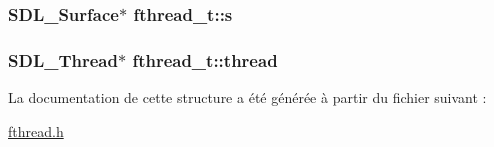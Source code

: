 \hypertarget{structfthread__t_a6d86e21267930a240426853ab443245b}{
\subsubsection[{s}]{\setlength{\rightskip}{0pt plus 5cm}\-S\-D\-L\-\_\-\-Surface$\ast$ {\bf fthread\-\_\-t\-::s}}}\label{structfthread__t_a6d86e21267930a240426853ab443245b}
\hypertarget{structfthread__t_a015a1b2637e8ef1d7316307ba3b4a245}{
\subsubsection[{thread}]{\setlength{\rightskip}{0pt plus 5cm}\-S\-D\-L\-\_\-\-Thread$\ast$ {\bf fthread\-\_\-t\-::thread}}}\label{structfthread__t_a015a1b2637e8ef1d7316307ba3b4a245}


\-La documentation de cette structure a été générée à partir du fichier suivant \-:\begin{DoxyCompactItemize}
\item 
\hyperlink{fthread_8h}{fthread.\-h}\end{DoxyCompactItemize}
